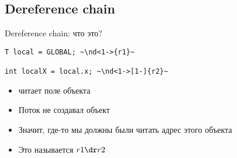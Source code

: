 %
\ifrender
\subsection{Dereference chain}
\begin{frame}[fragile]{Dereference chain: что это?}
\begin{center}
\begin{minipage}[3]{.5\linewidth}
	\begin{lstlisting}
T local = GLOBAL; ~\nd<1->{r1}~

int localX = local.x; ~\nd<1->[1-]{r2}~
	\end{lstlisting}
\end{minipage}
\end{center}


%

\begin{itemize}[<+->]
\item {} читает поле объекта
\item Поток не создавал объект
\item Значит, где-то мы должны были читать адрес этого объекта
\item Это называется $r1 \dr r2$
\end{itemize}


\end{frame}
\fi

